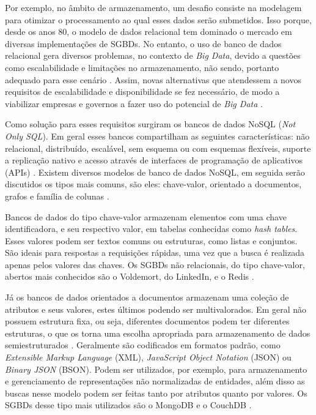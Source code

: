 Por exemplo, no âmbito de armazenamento, um desafio consiste na modelagem para otimizar o 
processamento ao qual esses dados serão submetidos. Isso porque, desde os anos 80, o modelo 
de dados relacional tem dominado o mercado em diversas implementações de SGBDs. No entanto, 
o uso de banco de dados relacional gera diversos problemas, no contexto de \textit{Big Data}, 
devido a questões como escalabilidade e limitações no armazenamento, não sendo, portanto 
adequado para esse cenário \cite{moniruzzaman2013nosql}. Assim, novas alternativas que 
atendessem a novos requisitos de escalabilidade e disponibilidade se fez necessário, de modo 
a viabilizar empresas e governos a fazer uso do potencial de \textit{Big Data} 
\cite{de2010nosql}.

Como solução para esses requisitos surgiram os bancos de dados NoSQL (\textit{Not Only SQL}). 
Em geral esses bancos compartilham as seguintes características: não relacional, distribuído, 
escalável, sem esquema ou com esquemas flexíveis, suporte a replicação nativo e acesso 
através de interfaces de programação de aplicativos (APIs) \cite{de2010nosql}. 
Existem diversos modelos de banco de dados NoSQL, em seguida serão discutidos os tipos mais 
comuns, são eles: chave-valor, orientado a documentos, grafos e família de colunas 
\cite{de2010nosql}.

Bancos de dados do tipo chave-valor armazenam elementos com uma chave identificadora, e seu 
respectivo valor, em tabelas conhecidas como \textit{hash tables}. Esses valores podem ser 
textos comuns ou estruturas, como listas e conjuntos. São ideais para respostas a requisições 
rápidas, uma vez que a busca é realizada apenas pelos valores das chaves. Os SGBDs não 
relacionais, do tipo chave-valor, abertos mais conhecidos são o Voldemort, do LinkedIn, e o 
Redis \cite{moniruzzaman2013nosql}.

Já os bancos de dados orientados a documentos armazenam uma coleção de atributos e seus 
valores, estes últimos podendo ser multivalorados. Em geral não possuem estrutura fixa, 
ou seja, diferentes documentos podem ter diferentes estruturas, o que os torna uma escolha 
apropriada para armazenamento de dados semiestruturados \cite{de2010nosql}. 
Geralmente são codificados em formatos padrão, como \textit{Extensible Markup Language} (XML), 
\textit{JavaScript Object Notation} (JSON) ou \textit{Binary JSON} (BSON).  Podem ser 
utilizados, por exemplo, para armazenamento e gerenciamento de representações não normalizadas 
de entidades, além disso as buscas nesse modelo podem ser feitas tanto por atributos quanto 
por valores. Os SGBDs desse tipo mais utilizados são o MongoDB e o CouchDB 
\cite{moniruzzaman2013nosql}.


